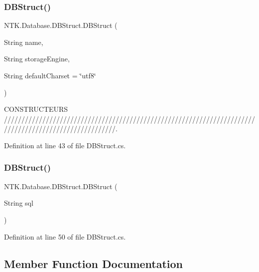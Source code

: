 \subsubsection{\texorpdfstring{DBStruct()}{DBStruct()}\hspace{0.1cm}{\footnotesize\ttfamily [1/2]}}
{\footnotesize\ttfamily N\+T\+K.\+Database.\+D\+B\+Struct.\+D\+B\+Struct (\begin{DoxyParamCaption}\item[{String}]{name,  }\item[{String}]{storage\+Engine,  }\item[{String}]{default\+Charset = {\ttfamily \char`\"{}utf8\char`\"{}} }\end{DoxyParamCaption})}



C\+O\+N\+S\+T\+R\+U\+C\+T\+E\+U\+RS ////////////////////////////////////////////////////////////////////////////////////////////////////////. 



Definition at line 43 of file D\+B\+Struct.\+cs.

\mbox{\label{class_n_t_k_1_1_database_1_1_d_b_struct_a6d75a7e254b6a4ca1cd4bab20ef69061}} 
\subsubsection{\texorpdfstring{DBStruct()}{DBStruct()}\hspace{0.1cm}{\footnotesize\ttfamily [2/2]}}
{\footnotesize\ttfamily N\+T\+K.\+Database.\+D\+B\+Struct.\+D\+B\+Struct (\begin{DoxyParamCaption}\item[{String}]{sql }\end{DoxyParamCaption})}



Definition at line 50 of file D\+B\+Struct.\+cs.



\subsection{Member Function Documentation}
\mbox{\label{class_n_t_k_1_1_database_1_1_d_b_struct_a4f3ed4839ae46e280b37086a9e4d1a77}} 
